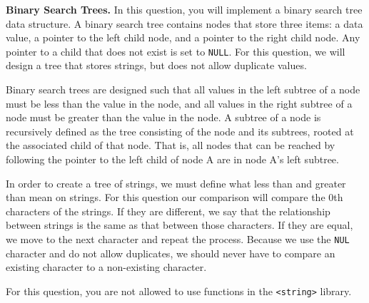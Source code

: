 \documentclass{exam}
\begin{document}
\begin{questions}

\question[30]
\textbf{Binary Search Trees.}
In this question, you will implement a binary search tree data structure. 
A binary search tree contains nodes that store three items: a data value, a pointer to the left child node, and a pointer to the right child node. 
Any pointer to a child that does not exist is set to \texttt{NULL}. 
For this question, we will design a tree that stores strings, but does not allow duplicate values. 

Binary search trees are designed such that all values in the left subtree of a node must be less than the value in the node, and all values in the right subtree of a node must be greater than the value in the node. 
A subtree of a node is recursively defined as the tree consisting of the node and its subtrees, rooted at the associated child of that node. 
That is, all nodes that can be reached by following the pointer to the left child of node A are in node A's left subtree. 

In order to create a tree of strings, we must define what less than and greater than mean on strings. 
For this question our comparison will compare the 0th characters of the strings. 
If they are different, we say that the relationship between strings is the same as that between those characters. 
If they are equal, we move to the next character and repeat the process. 
Because we use the \texttt{NUL} character and do not allow duplicates, we should never have to compare an existing character to a non-existing character. 

For this question, you are not allowed to use functions in the \texttt{<string>} library. 

\end{questions}
\end{document}
